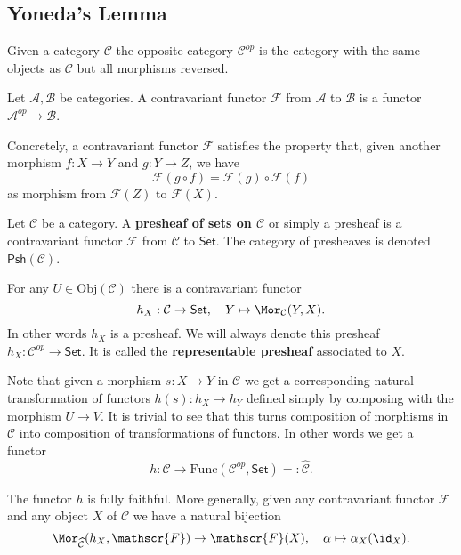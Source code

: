 \subsection{Yoneda's Lemma}
\begin{definition}
Given a category $\mathcal{C}$ the opposite category $\mathcal{C}^{op}$ is the category with the same objects as $\mathcal{C}$ but all morphisms reversed.
\end{definition}
\begin{definition}
Let $\mathcal{A},\mathcal{B}$ be categories. A contravariant functor $\mathscr{F}$ from $\mathcal{A}$ to $\mathcal{B}$ is a functor $\mathcal{A}^{op}\to\mathcal{B}$.\par
Concretely, a contravariant functor $\mathscr{F}$ satisfies the property that, given another morphism $f:X\to Y$ and $g:Y\to Z$, we have 
\[\mathscr{F}(g\circ f)=\mathscr{F}(g)\circ\mathscr{F}(f)\]
as morphism from $\mathscr{F}(Z)$ to $\mathscr{F}(X)$.
\end{definition}
\begin{definition}
Let $\mathcal{C}$ be a category. A \textbf{presheaf of sets on $\mathcal{C}$} or simply a presheaf is a contravariant functor $\mathscr{F}$ from $\mathcal{C}$ to $\mathsf{Set}$. The category of presheaves is denoted $\mathsf{Psh}(\mathcal{C})$.
\end{definition}
\begin{example}
For any $U\in\mathrm{Obj}(\mathcal{C})$ there is a contravariant functor
\[h_X:\mathcal{C}\to\mathsf{Set},\quad Y\mapsto\Mor_{\mathcal{C}}(Y,X).\]
In other words $h_X$ is a presheaf. We will always denote this presheaf $h_X:\mathcal{C}^{op}\to\mathsf{Set}$. It is called the \textbf{representable presheaf} associated to $X$.\par
Note that given a morphism $s:X\to Y$ in $\mathcal{C}$ we get a corresponding natural transformation of functors $h(s):h_X\to h_Y$ defined simply by composing with the morphism $U\to V$. It is trivial to see that this turns composition of morphisms in $\mathcal{C}$ into composition of transformations of functors. In other words we get a functor
\[h:\mathcal{C}\to\mathrm{Func}(\mathcal{C}^{op},\mathsf{Set})=:\widehat{\mathcal{C}}.\]
\end{example}
\begin{lemma}
The functor $h$ is fully faithful. More generally, given any contravariant functor $\mathscr{F}$ and any object $X$ of $\mathcal{C}$ we have a natural bijection
\[\Mor_{\widehat{\mathcal{C}}}(h_X,\mathscr{F})\to\mathscr{F}(X),\quad \alpha\mapsto \alpha_X(\id_X).\]
\end{lemma}
